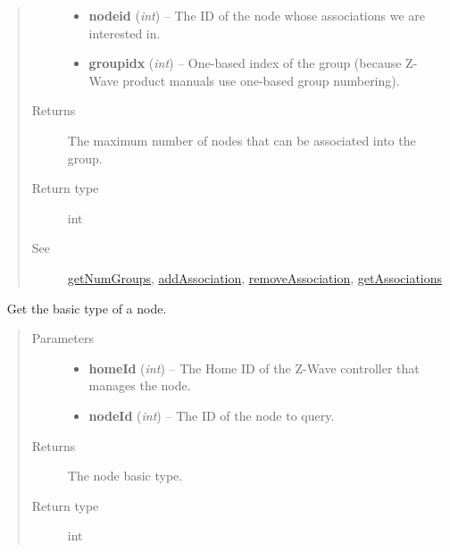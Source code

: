\documentclass[letterpaper,10pt,english]{sphinxmanual}
\begin{document}
\begin{fulllineitems}
\begin{fulllineitems}
\begin{quote}
\begin{description}
\begin{itemize}
\item {} 
\textbf{nodeid} (\emph{int}) -- The ID of the node whose associations we are interested in.

\item {} 
\textbf{groupidx} (\emph{int}) -- One-based index of the group (because Z-Wave product manuals use one-based group numbering).

\end{itemize}

\item[{Returns}] \leavevmode
The maximum number of nodes that can be associated into the group.

\item[{Return type}] \leavevmode
int

\item[{See}] \leavevmode
{\hyperref[libopenzwave:getnumgroups]{getNumGroups}}, {\hyperref[libopenzwave:addassociation]{addAssociation}}, {\hyperref[libopenzwave:removeassociation]{removeAssociation}}, {\hyperref[libopenzwave:getassociations]{getAssociations}}

\end{description}\end{quote}

\end{fulllineitems}


\begin{fulllineitems}
\label{libopenzwave:libopenzwave.PyManager.getNodeBasic}~\label{libopenzwave:getnodebasic}
Get the basic type of a node.
\begin{quote}\begin{description}
\item[{Parameters}] \leavevmode\begin{itemize}
\item {} 
\textbf{homeId} (\emph{int}) -- The Home ID of the Z-Wave controller that manages the node.

\item {} 
\textbf{nodeId} (\emph{int}) -- The ID of the node to query.

\end{itemize}

\item[{Returns}] \leavevmode
The node basic type.

\item[{Return type}] \leavevmode
int


\end{description}
\end{quote}
\end{fulllineitems}
\end{fulllineitems}
\end{document}
